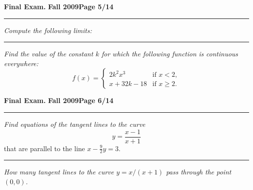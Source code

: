 \documentclass[12pt]{article}
\begin{document}
\newpage

\hfill{\large\bf Final Exam.}\hfill{\large\bf
  Fall 2009}\hfill{\large\bf Page 5/14}\hrule

\bigskip
{\problem[15 pts] \em Compute the following limits:}
\vspace{1cm}

\noindent
{}

\vspace{3cm}
\hrule

{\problem[10 pts] \em Find the value of the constant $k$ for which the
  following function is continuous everywhere:} 
\begin{equation*}
f(x) = \begin{cases}
2k^2x^3 &\text{if }x<2, \\
x+32k-18 &\text{if }x \geq 2.
\end{cases}
\end{equation*}
\vspace{5cm}
\begin{flushright}
\end{flushright}

\newpage


\hfill{\large\bf Final Exam.}\hfill{\large\bf
  Fall 2009}\hfill{\large\bf Page 6/14}\hrule

\bigskip
{\problem[15 pts] \em Find equations of the tangent lines to the curve}
\begin{equation*}
  y = \frac{x-1}{x+1}
\end{equation*}
that are parallel to the line $x-\tfrac{9}{2} y=3$.
\vspace{10cm}
\hrule
{\problem[10 pts] \em How many tangent lines to the curve $y=x/(x+1)$
  pass through the point $(0,0)$.}      
\end{document}
